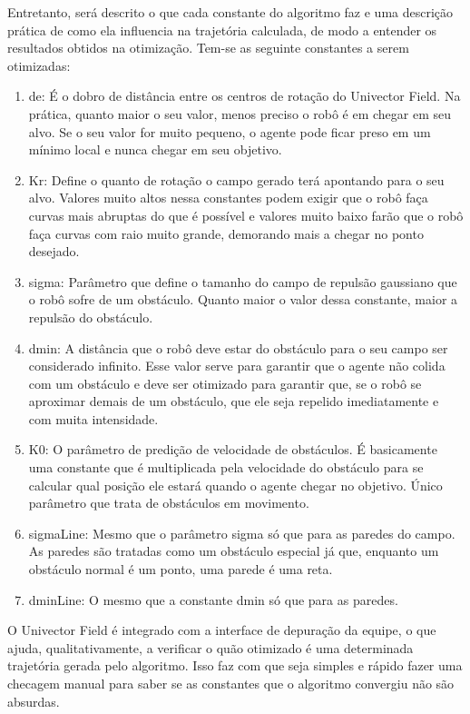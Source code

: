 \documentclass[10pt,fleqn,a4paper]{article}
\begin{document}
Entretanto, será descrito o que cada constante do algoritmo faz e uma descrição prática de como ela influencia na trajetória calculada, de modo a entender os resultados obtidos na otimização. Tem-se as seguinte constantes a serem otimizadas:
\begin{enumerate}
\item de: É o dobro de distância entre os centros de rotação do Univector Field. Na prática, quanto maior o seu valor, menos preciso o robô é em chegar em seu alvo. Se o seu valor for muito pequeno, o agente pode ficar preso em um mínimo local e nunca chegar em seu objetivo.
\item Kr: Define o quanto de rotação o campo gerado terá apontando para o seu alvo. Valores muito altos nessa constantes podem exigir que o robô faça curvas mais abruptas do que é possível e valores muito baixo farão que o robô faça curvas com raio muito grande, demorando mais a chegar no ponto desejado.
\item sigma: Parâmetro que define o tamanho do campo de repulsão gaussiano que o robô sofre de um obstáculo. Quanto maior o valor dessa constante, maior a repulsão do obstáculo.
\item dmin: A distância que o robô deve estar do obstáculo para o seu campo ser considerado infinito. Esse valor serve para garantir que o agente não colida com um obstáculo e deve ser otimizado para garantir que, se o robô se aproximar demais de um obstáculo, que ele seja repelido imediatamente e com muita intensidade.
\item K0: O parâmetro de predição de velocidade de obstáculos. É basicamente uma constante que é multiplicada pela velocidade do obstáculo para se calcular qual posição ele estará quando o agente chegar no objetivo. Único parâmetro que trata de obstáculos em movimento.
\item sigmaLine: Mesmo que o parâmetro sigma só que para as paredes do campo. As paredes são tratadas como um obstáculo especial já que, enquanto um obstáculo normal é um ponto, uma parede é uma reta.
\item dminLine:  O mesmo que a constante dmin só que para as paredes.
\end{enumerate}

O Univector Field é integrado com a interface de depuração da equipe, o que ajuda, qualitativamente, a verificar o quão otimizado é uma determinada trajetória gerada pelo algoritmo. Isso faz com que seja simples e rápido fazer uma checagem manual para saber se as constantes que o algoritmo convergiu não são absurdas.
\end{document}
